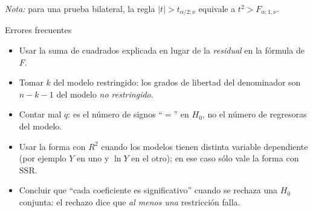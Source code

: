 \documentclass[11pt,letterpaper]{article}
\newcommand{\SSR}{\mathrm{SSR}}
\begin{document}
\textit{Nota:} para una prueba bilateral, la regla $|t|>t_{\alpha/2;\nu}$ equivale a
$t^2>F_{\alpha;1,\nu}$.

\begin{nota}{Errores frecuentes}
\begin{itemize}[leftmargin=1.2em,itemsep=1pt]
\item Usar la suma de cuadrados explicada en lugar de la \emph{residual} en la fórmula de $F$.
\item Tomar $k$ del modelo restringido: los grados de libertad del denominador son $n-k-1$ del modelo
\emph{no restringido}.
\item Contar mal $q$: es el número de signos ``$=$'' en $H_0$, no el número de regresoras del modelo.
\item Usar la forma con $R^2$ cuando los modelos tienen distinta variable dependiente (por ejemplo
$Y$ en uno y $\ln Y$ en el otro); en ese caso sólo vale la forma con $\SSR$.
\item Concluir que ``cada coeficiente es significativo'' cuando se rechaza una $H_0$ conjunta: el
rechazo dice que \emph{al menos una} restricción falla.
\end{itemize}
\end{nota}
\end{document}
